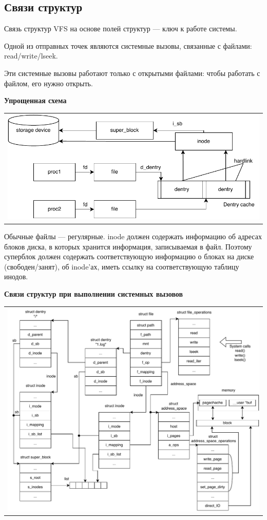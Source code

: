 \subsection{Связи структур}
Связь структур VFS на основе полей структур --- ключ к работе системы.

Одной из отправных точек являются системные вызовы, связанные с файлами: read/write/lseek. 

Эти системные вызовы работают только с открытыми файлами: чтобы работать с файлом, его нужно открыть.

\textbf{Упрощенная схема}
\begin{table}[h!]
  \centering
  \begin{tabular}{p{1\linewidth}}
    \centering
    \includegraphics[width=0.8\linewidth]{./images/struct_connect.pdf}
  \end{tabular}
\end{table}

Обычные файлы --- регулярные. inode должен содержать информацию об адресах блоков диска, в которых хранится информация, записываемая в файл. Поэтому суперблок должен содержать соответствующую информацию о блоках на диске (свободен/занят), об inode'ах, иметь ссылку на соответствующую таблицу инодов.

\textbf{Связи структур при выполнении системных вызовов}
\begin{table}[h!]
  \centering
  \begin{tabular}{p{1\linewidth}}
    \centering
    \includegraphics[width=0.8\linewidth]{./images/systemcalls_connect.pdf}
  \end{tabular}
\end{table}

